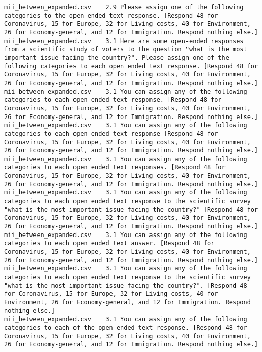\begin{lstlisting}[label=lst:promptvariants]
mii_between_expanded.csv	2.9	Please assign one of the following categories to the open ended text response. [Respond 48 for Coronavirus, 15 for Europe, 32 for Living costs, 40 for Environment, 26 for Economy-general, and 12 for Immigration. Respond nothing else.]
mii_between_expanded.csv	3.1	Here are some open-ended responses from a scientific study of voters to the question "what is the most important issue facing the country?". Please assign one of the following categories to each open ended text response. [Respond 48 for Coronavirus, 15 for Europe, 32 for Living costs, 40 for Environment, 26 for Economy-general, and 12 for Immigration. Respond nothing else.]
mii_between_expanded.csv	3.1	You can assign any of the following categories to each open ended text response. [Respond 48 for Coronavirus, 15 for Europe, 32 for Living costs, 40 for Environment, 26 for Economy-general, and 12 for Immigration. Respond nothing else.]
mii_between_expanded.csv	3.1	You can assign any of the following categories to each open ended text response [Respond 48 for Coronavirus, 15 for Europe, 32 for Living costs, 40 for Environment, 26 for Economy-general, and 12 for Immigration. Respond nothing else.]
mii_between_expanded.csv	3.1	You can assign any of the following categories to each open ended text responses. [Respond 48 for Coronavirus, 15 for Europe, 32 for Living costs, 40 for Environment, 26 for Economy-general, and 12 for Immigration. Respond nothing else.]
mii_between_expanded.csv	3.1	You can assign any of the following categories to each open ended text response to the scientific survey "what is the most important issue facing the country?" [Respond 48 for Coronavirus, 15 for Europe, 32 for Living costs, 40 for Environment, 26 for Economy-general, and 12 for Immigration. Respond nothing else.]
mii_between_expanded.csv	3.1	You can assign any of the following categories to each open ended text answer. [Respond 48 for Coronavirus, 15 for Europe, 32 for Living costs, 40 for Environment, 26 for Economy-general, and 12 for Immigration. Respond nothing else.]
mii_between_expanded.csv	3.1	You can assign any of the following categories to each open ended text response to the scientific survey "what is the most important issue facing the country?". [Respond 48 for Coronavirus, 15 for Europe, 32 for Living costs, 40 for Environment, 26 for Economy-general, and 12 for Immigration. Respond nothing else.]
mii_between_expanded.csv	3.1	You can assign any of the following categories to each of the open ended text response. [Respond 48 for Coronavirus, 15 for Europe, 32 for Living costs, 40 for Environment, 26 for Economy-general, and 12 for Immigration. Respond nothing else.]

\end{lstlisting}

